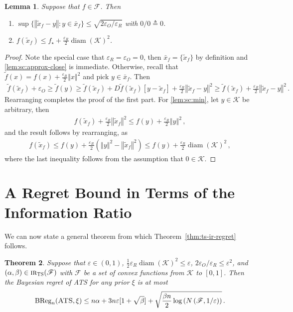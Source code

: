 \documentclass[letter, 12pt]{report}
\newcommand{\epsR}{{\epsilon_R}}
\newcommand{\epsO}{{\epsilon_O}}
\newcommand{\BReg}{\textrm{BReg}}
\newcommand{\norm}[1]{\left \Vert  #1 \right \Vert}
\newcommand{\cK}{\mathcal K}
\newcommand{\sF}{\mathscr F}
\newcommand{\diam}{\operatorname{diam}}
\newcommand{\1}{\mathbf{1}}
\newcommand{\IR}{\operatorname{\textsc{ir}}}
\newcommand{\ts}{\textsc{TS}\xspace}
\newcommand{\ats}{\textsc{ATS}}
\renewcommand{\epsilon}{\varepsilon}
\theoremstyle{plain}
\newtheorem{theorem}{Theorem}
\newtheorem{lemma}[theorem]{Lemma}
\theoremstyle{definition}
\theoremstyle{remark}
\begin{document}
\begin{lemma}\label{lem:sc}
    Suppose that $f \in \sF$.
    Then
    \begin{enumerate}
        \item $\sup \{\norm{\tilde x_f - y} : y \in \bar x_f\} \leq \sqrt{2\epsO / \epsR}$ with $0/0 \triangleq 0$. \label{lem:sc:approx-close}
        \item $f(\tilde x_f) \leq f_\star + \frac{\epsR}{2} \diam(\cK)^2$. \label{lem:sc:min}
    \end{enumerate}
\end{lemma}

\begin{proof}
    Note the special case that $\epsR = \epsO = 0$, then $\bar x_f = \{\tilde x_f\}$ by definition and \ref{lem:sc:approx-close} is immediate.
    Otherwise, recall that $\tilde f(x) = f(x) + \frac{\epsR}{2} \norm{x}^2$ and pick $y \in \bar x_f$. Then
    \begin{align*}
        \tilde f(\tilde x_f) + \epsO
        \geq \tilde f(y)
        \geq \tilde f(\tilde x_f) + D\tilde f(\tilde x_f)[y - \tilde x_f] + \frac{\epsR}{2} \norm{\tilde x_f - y}^2
        \geq \tilde f(\tilde x_f) + \frac{\epsR}{2} \norm{\tilde x_f - y}^2 \,.
    \end{align*}
    Rearranging completes the proof of the first part.
    For \ref{lem:sc:min}, let $y \in \cK$ be arbitrary, then
    \begin{align*}
        f(\tilde x_f) + \frac{\epsR}{2} \norm{\tilde x_f}^2 \leq f(y) + \frac{\epsR}{2} \norm{y}^2  \,,
    \end{align*}
    and the result follows by rearranging, as
    \begin{align*}
        f(\tilde x_f)
        \leq f(y) + \frac{\epsR}{2}(\norm{y}^2 - \norm{\tilde x_f}^2)
        \leq f(y) + \frac{\epsR}{2} \diam(\cK)^2 \,,
    \end{align*}
    where the last inequality follows from the assumption that $ 0 \in \cK$.
\end{proof}


\section{A Regret Bound in Terms of the Information Ratio}\label{sec:ir-general}
We can now state a general theorem from which Theorem~\ref{thm:ts-ir-regret} follows.

\begin{theorem}\label{thm:ir-general}
    Suppose that $\epsilon \in (0,1)$, $\frac{1}{2} \epsR \diam(\cK)^2 \leq \epsilon$, $2\epsO/\epsR \leq \epsilon^2$, and $(\alpha, \beta) \in \IR_\ts(\sF)$ with $\sF$ be a set of convex functions from $\cK$ to $[0,1]$.
    Then the Bayesian regret of \ats{} for any prior $\xi$ is at most
    \begin{align*}
        \BReg_n(\ats, \xi) \leq n \alpha + 3n\epsilon[1 + \sqrt{\beta}] + \sqrt{\frac{\beta n}{2} \log\left(N\left(\sF, 1/\epsilon\right)\right)} \,.
    \end{align*}
\end{theorem}
\end{document}
